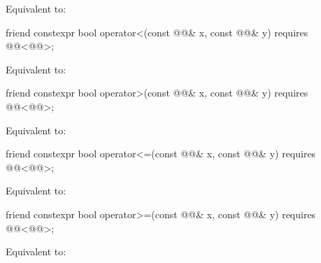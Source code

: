 \begin{itemdescr}
\pnum
\effects
Equivalent to: 
\end{itemdescr}

%
\begin{itemdecl}
friend constexpr bool operator<(const @@& x, const @@& y)
  requires @@<@@>;
\end{itemdecl}

\begin{itemdescr}
\pnum
\effects
Equivalent to: 
\end{itemdescr}

%
\begin{itemdecl}
friend constexpr bool operator>(const @@& x, const @@& y)
  requires @@<@@>;
\end{itemdecl}

\begin{itemdescr}
\pnum
\effects
Equivalent to: 
\end{itemdescr}

%
\begin{itemdecl}
friend constexpr bool operator<=(const @@& x, const @@& y)
  requires @@<@@>;
\end{itemdecl}

\begin{itemdescr}
\pnum
\effects
Equivalent to: 
\end{itemdescr}

%
\begin{itemdecl}
friend constexpr bool operator>=(const @@& x, const @@& y)
  requires @@<@@>;
\end{itemdecl}

\begin{itemdescr}
\pnum
\effects
Equivalent to: 
\end{itemdescr}

